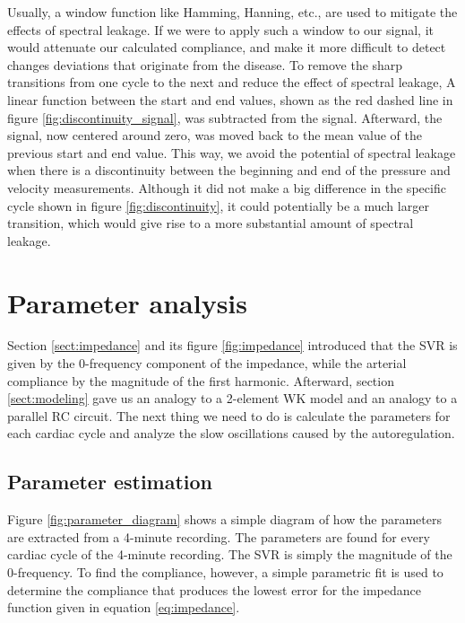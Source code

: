 Usually, a window function like Hamming, Hanning, etc., are used to mitigate the effects of spectral leakage. If we were to apply such a window to our signal, it would attenuate our calculated compliance, and make it more difficult to detect changes deviations that originate from the disease. To remove the sharp transitions from one cycle to the next and reduce the effect of spectral leakage, A linear function between the start and end values, shown as the red dashed line in figure \ref{fig:discontinuity_signal}, was subtracted from the signal. Afterward, the signal, now centered around zero, was moved back to the mean value of the previous start and end value. This way, we avoid the potential of spectral leakage when there is a discontinuity between the beginning and end of the pressure and velocity measurements. Although it did not make a big difference in the specific cycle shown in figure \ref{fig:discontinuity}, it could potentially be a much larger transition, which would give rise to a more substantial amount of spectral leakage.


\section{Parameter analysis} 

Section \ref{sect:impedance} and its figure \ref{fig:impedance} introduced that the SVR is given by the 0-frequency component of the impedance, while the arterial compliance by the magnitude of the first harmonic. Afterward, section \ref{sect:modeling} gave us an analogy to a 2-element WK model and an analogy to a parallel RC circuit. The next thing we need to do is calculate the parameters for each cardiac cycle and analyze the slow oscillations caused by the autoregulation.

\subsection{Parameter estimation} \label{sect:parameter_estimation}

Figure \ref{fig:parameter_diagram} shows a simple diagram of how the parameters are extracted from a 4-minute recording. The parameters are found for every cardiac cycle of the 4-minute recording. The SVR is simply the magnitude of the 0-frequency. To find the compliance, however, a simple parametric fit is used to determine the compliance that produces the lowest error for the impedance function given in equation \ref{eq:impedance}. 

